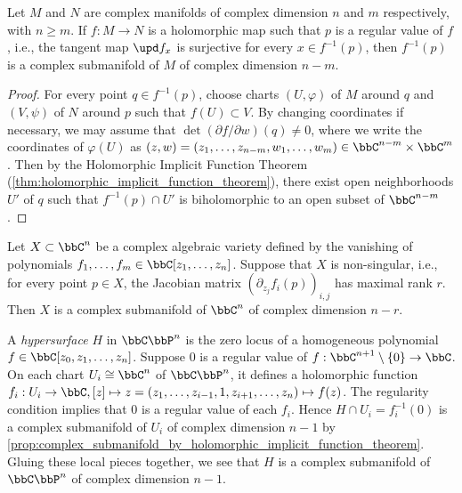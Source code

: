 \begin{proposition}\label{prop:complex_submanifold_by_holomorphic_implicit_function_theorem}
	Let \(M\) and \(N\) are complex manifolds of complex dimension \(n\) and \(m\) respectively, with \(n \geq m\).
	If \(f: M\to N\) is a holomorphic map such that \(p\) is a regular value of \(f\),
	i.e., the tangent map \(\upd f_x\) is surjective for every \(x\in f^{-1}(p)\),
	then \(f^{-1}(p)\) is a complex submanifold of \(M\) of complex dimension \(n - m\).
\end{proposition}
\begin{proof}
	For every point \(q\in f^{-1}(p)\), choose charts \((U,\varphi)\) of \(M\) around \(q\) and \((V,\psi)\) of \(N\) around \(p\) such that \(f(U) \subset V\).
	By changing coordinates if necessary, we may assume that \(\det(\partial f/\partial w)(q) \neq 0\),
	where we write the coordinates of \(\varphi(U)\) as \((z,w) = (z_1, \ldots, z_{n-m}, w_1, \ldots, w_m) \in \bbC^{n-m} \times \bbC^m\).
	Then by the Holomorphic Implicit Function Theorem (\cref{thm:holomorphic_implicit_function_theorem}),
	there exist open neighborhoods \(U'\) of \(q\) such that \(f^{-1}(p)\cap U'\) is biholomorphic to an open subset of \(\bbC^{n-m}\).
\end{proof}

\begin{example}\label{eg:non_singular_complex_algebraic_variety_as_complex_manifold}
	Let \(X \subset \bbC^n\) be a complex algebraic variety defined by the vanishing of polynomials \(f_1, \ldots, f_m \in \bbC[z_1, \ldots, z_n]\).
	Suppose that \(X\) is non-singular, i.e., for every point \(p\in X\), the Jacobian matrix \(\left( \partial_{z_j}f_i(p) \right)_{i,j}\) has maximal rank \(r\).
	Then \(X\) is a complex submanifold of \(\bbC^n\) of complex dimension \(n - r\).
\end{example}

\begin{example}\label{eg:hypersurface_in_CPn_as_complex_manifold}
	A \emph{hypersurface} \(H\) in \(\bbC\bbP^n\) is the zero locus of a homogeneous polynomial \(f \in \bbC[z_0, z_1, \ldots, z_n]\).
	Suppose \(0\) is a regular value of \(f: \bbC^{n+1}\setminus \{0\} \to \bbC\).
	On each chart \(U_i \cong \bbC^n\) of \(\bbC\bbP^n\), it defines a holomorphic function \(f_i: U_i \to \bbC, [z] \mapsto z = (z_1, \ldots, z_{i-1}, 1, z_{i+1}, \ldots, z_n) \mapsto f(z)\).
	The regularity condition implies that \(0\) is a regular value of each \(f_i\).
	Hence \(H \cap U_i = f_i^{-1}(0)\) is a complex submanifold of \(U_i\) of complex dimension \(n-1\) by \cref{prop:complex_submanifold_by_holomorphic_implicit_function_theorem}.
	Gluing these local pieces together, we see that \(H\) is a complex submanifold of \(\bbC\bbP^n\) of complex dimension \(n-1\).
\end{example}

